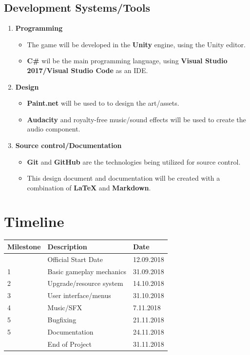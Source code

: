 \documentclass[a4paper]{scrreprt}
\begin{document}
\section{Development Systems/Tools}
\begin{enumerate}
  \item \textbf{Programming}
  \begin{itemize}
    \item The game will be developed in the \textbf{Unity} engine, using the Unity editor. 
    \item \textbf{C\#} wil be the main programming language, using \textbf{Visual Studio 2017/Visual Studio Code} as an IDE.
  \end{itemize}
  \item \textbf{Design}
  \begin{itemize}
    \item \textbf{Paint.net} will be used to to design the art/assets.
    \item \textbf{Audacity} and royalty-free music/sound effects will be used to create the audio component.
  \end{itemize}
  \item \textbf{Source control/Documentation}
  \begin{itemize}
    \item \textbf{Git} and \textbf{GitHub} are the technologies being utilized for source control. 
    \item This design document and documentation will be created with a combination of \textbf{LaTeX} and \textbf{Markdown}.
  \end{itemize}

\end{enumerate}


  



\chapter{Timeline}
\begin{table}[h]
\centering
\begin{tabular}{|l|l|l|}
\hline
\textbf{Milestone} & \textbf{Description} & \textbf{Date} \\\hline
& Official Start Date & 12.09.2018 \\
1 & Basic gameplay mechanics  & 31.09.2018 \\
2 & Upgrade/resource system  & 14.10.2018 \\
3 & User interface/menus &31.10.2018 \\
4 & Music/SFX & 7.11.2018 \\
5 & Bugfixing & 21.11.2018 \\
5 & Documentation & 24.11.2018 \\
& End of Project & 31.11.2018 \\
\hline
\end{tabular}
\end{table}
\end{document}
